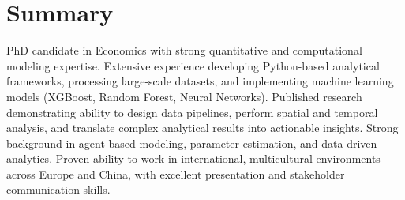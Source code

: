 \documentclass[a4paper,12pt]{article}
\begin{document}
\section{Summary}
PhD candidate in Economics with strong quantitative and computational modeling expertise. Extensive experience developing Python-based analytical frameworks, processing large-scale datasets, and implementing machine learning models (XGBoost, Random Forest, Neural Networks). Published research demonstrating ability to design data pipelines, perform spatial and temporal analysis, and translate complex analytical results into actionable insights. Strong background in agent-based modeling, parameter estimation, and data-driven analytics. Proven ability to work in international, multicultural environments across Europe and China, with excellent presentation and stakeholder communication skills.

\end{document}
